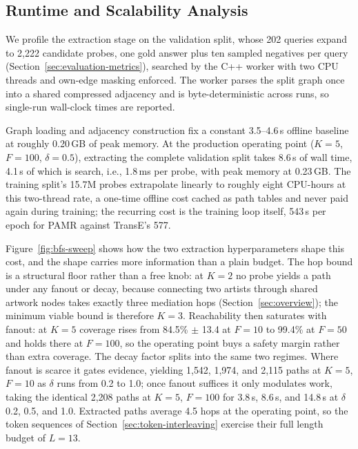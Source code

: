 \documentclass[runningheads]{llncs}
\begin{document}
\subsection{Runtime and Scalability Analysis}
\label{sec:runtime}

We profile the extraction stage on the validation split, whose 202
queries expand to 2,222 candidate probes, one gold answer plus ten
sampled negatives per query (Section~\ref{sec:evaluation-metrics}),
searched by the C++ worker with two CPU threads and own-edge masking
enforced. The worker parses the split graph once into a shared
compressed adjacency and is byte-deterministic across runs, so
single-run wall-clock times are reported.

Graph loading and adjacency construction fix a constant 3.5--4.6\,s
offline baseline at roughly 0.20\,GB of peak memory. At the production
operating point ($K = 5$, $F = 100$, $\delta = 0.5$), extracting the
complete validation split takes 8.6\,s of wall time, 4.1\,s of which is
search, i.e., 1.8\,ms per probe, with peak memory at 0.23\,GB. The
training split's 15.7M probes extrapolate linearly to roughly eight
CPU-hours at this two-thread rate, a one-time offline cost cached as
path tables and never paid again during training; the recurring cost is
the training loop itself, 543\,s per epoch for PAMR against TransE's
577.

Figure~\ref{fig:bfs-sweep} shows how the two extraction hyperparameters
shape this cost, and the shape carries more information than a plain
budget. The hop bound is a structural floor rather than a free knob: at
$K = 2$ no probe yields a path under any fanout or decay, because
connecting two artists through shared artwork nodes takes exactly three
mediation hops (Section~\ref{sec:overview}); the minimum viable bound
is therefore $K = 3$. Reachability then saturates with fanout: at
$K = 5$ coverage rises from 84.5\% $\pm$ 13.4 at $F = 10$ to 99.4\% at
$F = 50$ and holds there at $F = 100$, so the operating point buys a
safety margin rather than extra coverage. The decay factor splits into
the same two regimes. Where fanout is scarce it gates evidence,
yielding 1{,}542, 1{,}974, and 2{,}115 paths at $K = 5$, $F = 10$ as
$\delta$ runs from 0.2 to 1.0; once fanout suffices it only modulates
work, taking the identical 2{,}208 paths at $K = 5$, $F = 100$ for
3.8\,s, 8.6\,s, and 14.8\,s at $\delta$ 0.2, 0.5, and 1.0. Extracted
paths average 4.5 hops at the operating point, so the token sequences
of Section~\ref{sec:token-interleaving} exercise their full length
budget of $L = 13$.
\end{document}
